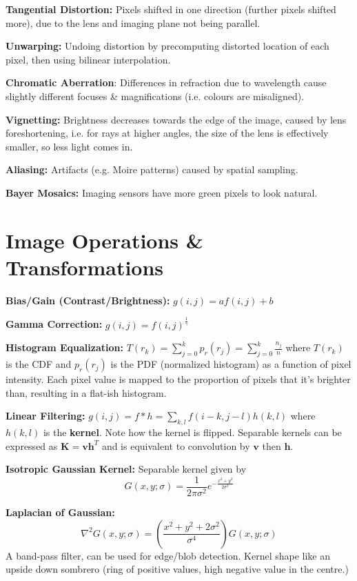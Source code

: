 \documentclass[twocolumn, 10pt]{extarticle}
\begin{document}
\textbf{Tangential Distortion:} Pixels shifted in one direction (further pixels shifted more), due to the lens and
imaging plane not being parallel.

\textbf{Unwarping:} Undoing distortion by precomputing distorted location of each pixel, then using bilinear
interpolation.

\textbf{Chromatic Aberration}: Differences in refraction due to wavelength cause slightly different focuses \&
magnifications (i.e. colours are misaligned).

\textbf{Vignetting:} Brightness decreases towards the edge of the image, caused by lens foreshortening, i.e. for rays
at higher angles, the size of the lens is effectively smaller, so less light comes in.

\textbf{Aliasing:} Artifacts (e.g. Moire patterns) caused by spatial sampling.

\textbf{Bayer Mosaics:} Imaging sensors have more green pixels to look natural.

\section{Image Operations \& Transformations} %

\textbf{Bias/Gain (Contrast/Brightness):} \(g(i, j) = af(i, j) + b\)

\textbf{Gamma Correction:} \(g(i, j) = f(i, j)^\frac{1}{\gamma}\)

\textbf{Histogram Equalization:} \(\displaystyle T(r_k) = \sum _{j = 0}^k p_r(r_j) = \sum _{j = 0}^k \frac{n_j}{n}\)
where \(T(r_k)\) is the CDF and \(p_r(r_j)\) is the PDF (normalized histogram) as a function of pixel intensity.
Each pixel value is mapped to the proportion of pixels that it's brighter than, resulting in a flat-ish histogram.

\textbf{Linear Filtering:} \(\displaystyle g(i, j) = f * h = \sum _{k, l} f(i - k, j - l)h(k, l)\) where \(h(k, l)\)
is the \textbf{kernel}. Note how the kernel is flipped. Separable kernels can be expressed as \(\bm K = \bm v\bm h^T\)
and is equivalent to convolution by \(\bm v\) then \(\bm h\).

\textbf{Isotropic Gaussian Kernel:} Separable kernel given by
\[\displaystyle G(x, y; \sigma) = \frac{1}{2\pi\sigma^2}e^{-\frac{x^2 + y^2}{2\sigma^2}}\]

\textbf{Laplacian of Gaussian:}
\[\displaystyle \nabla^2 G(x, y; \sigma) = \left(\frac{x^2 + y^2 + 2\sigma^2}{\sigma^4}\right)G(x, y; \sigma)\]
A band-pass filter, can be used for edge/blob detection. Kernel shape like an upside down sombrero (ring of positive
values, high negative value in the centre.)
\end{document}
